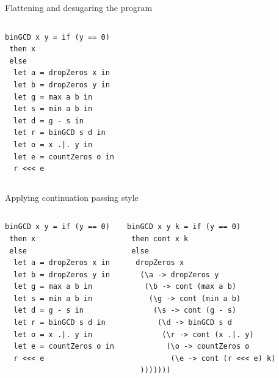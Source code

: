 \documentclass[pdf]{beamer}
\begin{document}
\begin{frame}[fragile]{Flattening and desugaring the program}
\begin{columns}[T]
\begin{verbatim}
binGCD x y = if (y == 0)
 then x
 else
  let a = dropZeros x in
  let b = dropZeros y in
  let g = max a b in
  let s = min a b in
  let d = g - s in
  let r = binGCD s d in
  let o = x .|. y in
  let e = countZeros o in
  r <<< e
\end{verbatim}

\end{columns}

\end{frame}


\begin{frame}[fragile]{Applying continuation passing style}
\begin{columns}[T] %
\begin{verbatim}
binGCD x y = if (y == 0)
 then x
 else
  let a = dropZeros x in
  let b = dropZeros y in
  let g = max a b in
  let s = min a b in
  let d = g - s in
  let r = binGCD s d in
  let o = x .|. y in
  let e = countZeros o in
  r <<< e
\end{verbatim}
\begin{verbatim}
binGCD x y k = if (y == 0)
 then cont x k
 else
  dropZeros x
   (\a -> dropZeros y
    (\b -> cont (max a b)
     (\g -> cont (min a b)
      (\s -> cont (g - s)
       (\d -> binGCD s d
        (\r -> cont (x .|. y)
         (\o -> countZeros o
          (\e -> cont (r <<< e) k)
   )))))))
\end{verbatim}
\end{columns}
\end{frame}
\end{document}
